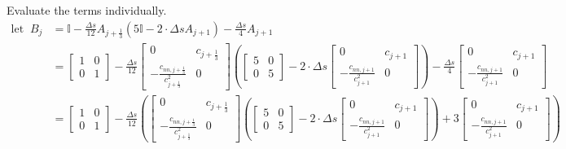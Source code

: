 \documentclass{article}
\begin{document}
Evaluate the terms individually.
\begin{align*}
	\mathrm{let}\;\;B_j                              & =\mathbb{I} - \frac{\Delta s}{12}A_{j+\frac{1}{3}}\left(5\mathbb{I}-2\cdot\Delta sA_{j+1}\right)- \frac{\Delta s}{4}A_{j+1}                                                                                                                                                                                                                                                                                                                                                                                                                                                                                                                                      \\
	                                                 & = \begin{bmatrix} 1 & 0 \\ 0 & 1 \end{bmatrix} - \frac{\Delta s}{12}\begin{bmatrix} 0 & c_{j+\frac{1}{3}} \\ -\frac{c_{nn, j+\frac{1}{3}}}{c_{j+\frac{1}{3}}^2} & 0 \end{bmatrix}\left(\begin{bmatrix} 5 & 0 \\ 0 & 5 \end{bmatrix} -2\cdot\Delta s\begin{bmatrix}  0 & c_{j+1} \\ -\frac{c_{nn, j+1}}{c_{j+1}^2} & 0\end{bmatrix}\right) - \frac{\Delta s}{4}\begin{bmatrix} 0 & c_{j+1} \\ -\frac{c_{nn, j+1}}{c_{j+1}^2} & 0\end{bmatrix}                                                                                         \\
	                                                 & = \begin{bmatrix} 1 & 0 \\ 0 & 1 \end{bmatrix} - \frac{\Delta s}{12}\left(\begin{bmatrix} 0 & c_{j+\frac{1}{3}} \\ -\frac{c_{nn, j+\frac{1}{3}}}{c_{j+\frac{1}{3}}^2} & 0 \end{bmatrix}\left(\begin{bmatrix} 5 & 0 \\ 0 & 5 \end{bmatrix} -2\cdot\Delta s\begin{bmatrix}  0 & c_{j+1} \\ -\frac{c_{nn, j+1}}{c_{j+1}^2} & 0\end{bmatrix}\right) +3\begin{bmatrix} 0 & c_{j+1} \\ -\frac{c_{nn, j+1}}{c_{j+1}^2} & 0\end{bmatrix}\right)                                                                                              \\

\end{align*}
\end{document}
